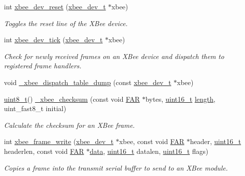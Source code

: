 \begin{DoxyCompactItemize}
int \hyperlink{group__xbee__device_gad312efa700cca7ca044cddf364cc51f5}{xbee\+\_\+dev\+\_\+reset} (\hyperlink{structxbee__dev__t}{xbee\+\_\+dev\+\_\+t} $\ast$xbee)
\begin{DoxyCompactList}\small\item\em Toggles the reset line of the X\+Bee device. \end{DoxyCompactList}\item 
int \hyperlink{group__xbee__device_gaf16e8e532b1eb587794b60222c3a0cce}{xbee\+\_\+dev\+\_\+tick} (\hyperlink{structxbee__dev__t}{xbee\+\_\+dev\+\_\+t} $\ast$xbee)
\begin{DoxyCompactList}\small\item\em Check for newly received frames on an X\+Bee device and dispatch them to registered frame handlers. \end{DoxyCompactList}\item 
void \hyperlink{group__xbee__device_gac7c192386ffce72242c2c8494b261491}{\+\_\+xbee\+\_\+dispatch\+\_\+table\+\_\+dump} (const \hyperlink{structxbee__dev__t}{xbee\+\_\+dev\+\_\+t} $\ast$xbee)
\item 
\hyperlink{group__hal__dos_gae1affc9ca37cfb624959c866a73f83c2}{uint8\+\_\+t}() \hyperlink{group__xbee__device_gae8a32665036083d3a236fcde4359cc79}{\+\_\+xbee\+\_\+checksum} (const void \hyperlink{group__hal_gaef060b3456fdcc093a7210a762d5f2ed}{F\+AR} $\ast$bytes, \hyperlink{group__hal__dos_ga5a8b2dc9e45a9ee81a94ef304fb62505}{uint16\+\_\+t} \hyperlink{group__zdo_gab2b3adeb2a67e656ff030b56727fd0ac}{length}, uint\+\_\+fast8\+\_\+t initial)
\begin{DoxyCompactList}\small\item\em Calculate the checksum for an X\+Bee frame. \end{DoxyCompactList}\item 
int \hyperlink{group__xbee__device_ga51f281b72bffcc99eec0e8c7f65a5f3f}{xbee\+\_\+frame\+\_\+write} (\hyperlink{structxbee__dev__t}{xbee\+\_\+dev\+\_\+t} $\ast$xbee, const void \hyperlink{group__hal_gaef060b3456fdcc093a7210a762d5f2ed}{F\+AR} $\ast$header, \hyperlink{group__hal__dos_ga5a8b2dc9e45a9ee81a94ef304fb62505}{uint16\+\_\+t} headerlen, const void \hyperlink{group__hal_gaef060b3456fdcc093a7210a762d5f2ed}{F\+AR} $\ast$\hyperlink{group__xbee__io_gac5955aa1e44ff234e6d78a19cf68f25c}{data}, \hyperlink{group__hal__dos_ga5a8b2dc9e45a9ee81a94ef304fb62505}{uint16\+\_\+t} datalen, \hyperlink{group__hal__dos_ga5a8b2dc9e45a9ee81a94ef304fb62505}{uint16\+\_\+t} flags)
\begin{DoxyCompactList}\small\item\em Copies a frame into the transmit serial buffer to send to an X\+Bee module. \end{DoxyCompactList}\item 

\end{DoxyCompactItemize}
